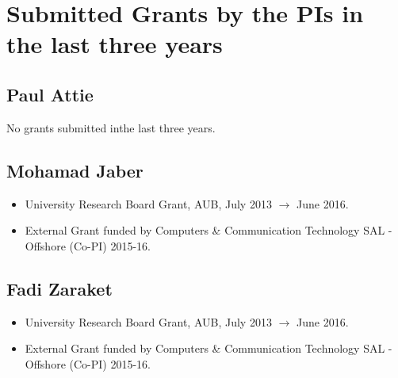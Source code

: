 \section{Submitted Grants by the PIs in the last three years}

\subsection{Paul Attie}

No grants submitted inthe last three years.



\subsection{Mohamad Jaber}
\begin{itemize}
\item{University Research Board Grant, AUB, July 2013 $\rightarrow$ June 2016.}
\item{External Grant funded by Computers \& Communication Technology SAL - Offshore (Co-PI) 2015-16.}
\end{itemize}




\subsection{Fadi Zaraket}
\begin{itemize}
\item{University Research Board Grant, AUB, July 2013 $\rightarrow$ June 2016.}
\item{External Grant funded by Computers \& Communication Technology SAL - Offshore (Co-PI) 2015-16.}
\end{itemize}

